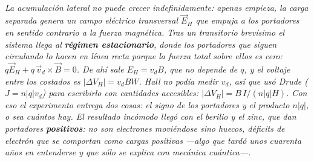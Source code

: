 \begin{center}
\begin{tikzpicture}[scale=1]
\end{tikzpicture}\\[0.5em]
{\small\itshape La acumulación lateral no puede crecer indefinidamente: apenas
empieza, la carga separada genera un campo eléctrico transversal $\vec E_H$ que
empuja a los portadores en sentido contrario a la fuerza magnética. Tras un
transitorio brevísimo el sistema llega al \textbf{régimen estacionario}, donde
los portadores que siguen circulando lo hacen en línea recta porque la fuerza
total sobre ellos es cero: $q\vec E_H + q\,\vec v_d\times\vec B = 0$. De ahí
sale $E_H = v_d B$, que no depende de $q$, y el voltaje entre los costados es
$|\Delta V_H| = v_d B W$. Hall no podía medir $v_d$, así que usó Drude
($J = n|q|v_d$) para escribirlo con cantidades accesibles:
$|\Delta V_H| = B\,I/(n|q|H)$. Con eso el experimento entrega dos cosas: el
\emph{signo} de los portadores y el producto $n|q|$, o sea cuántos hay. El
resultado incómodo llegó con el berilio y el zinc, que dan portadores
\textbf{positivos}: no son electrones moviéndose sino \emph{huecos}, déficits de
electrón que se comportan como cargas positivas ---algo que tardó unos cuarenta
años en entenderse y que sólo se explica con mecánica cuántica---.}
\end{center}
